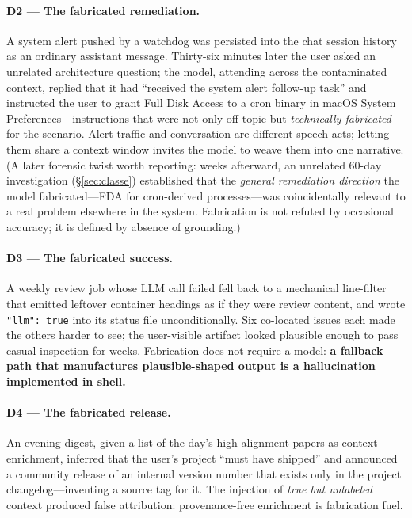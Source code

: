 \paragraph{D2 --- The fabricated remediation.} A system alert pushed by a
watchdog was persisted into the chat session history as an ordinary
assistant message. Thirty-six minutes later the user asked an unrelated
architecture question; the model, attending across the contaminated
context, replied that it had ``received the system alert follow-up task''
and instructed the user to grant Full Disk Access to a cron binary in
macOS System Preferences---instructions that were not only off-topic but
\emph{technically fabricated} for the scenario. Alert traffic and
conversation are different speech acts; letting them share a context
window invites the model to weave them into one narrative. (A later
forensic twist worth reporting: weeks afterward, an unrelated 60-day
investigation (\S\ref{sec:classe}) established that the \emph{general
remediation direction} the model fabricated---FDA for cron-derived
processes---was coincidentally relevant to a real problem elsewhere in
the system. Fabrication is not refuted by occasional accuracy; it is
defined by absence of grounding.)

\paragraph{D3 --- The fabricated success.} A weekly review job whose LLM
call failed fell back to a mechanical line-filter that emitted leftover
container headings as if they were review content, and wrote
\texttt{"llm": true} into its status file unconditionally. Six co-located
issues each made the others harder to see; the user-visible artifact
looked plausible enough to pass casual inspection for weeks. Fabrication
does not require a model: \textbf{a fallback path that manufactures
plausible-shaped output is a hallucination implemented in shell.}

\paragraph{D4 --- The fabricated release.} An evening digest, given a
list of the day's high-alignment papers as context enrichment, inferred
that the user's project ``must have shipped'' and announced a community
release of an internal version number that exists only in the project
changelog---inventing a source tag for it. The injection of \emph{true
but unlabeled} context produced false attribution: provenance-free
enrichment is fabrication fuel.

